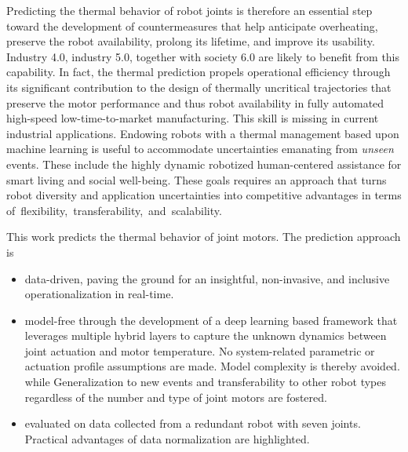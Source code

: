 \documentclass{ifacconf}
\begin{document}
Predicting the thermal behavior of robot joints is therefore an essential step toward the development of countermeasures that help anticipate overheating, preserve the robot availability,  prolong its lifetime, and improve its usability. Industry 4.0, industry 5.0, together with society 6.0 are likely to benefit from this capability. In fact, the thermal prediction propels operational efficiency through its significant contribution to the design of thermally uncritical trajectories that  preserve the motor performance and thus robot availability in fully automated high-speed low-time-to-market manufacturing. This skill is missing in current industrial applications. Endowing robots with a thermal management based upon machine learning is useful to accommodate uncertainties emanating from \textit{unseen} events. These include the highly dynamic robotized human-centered assistance for smart living and social well-being. These goals requires an approach that turns robot diversity and application uncertainties into competitive advantages in terms \mbox{of flexibility,  transferability, and scalability.}

This work predicts  the thermal behavior of joint motors. The prediction approach is
\begin{itemize}
	\item data-driven, paving the ground for an  insightful, non-invasive, and inclusive operationalization in real-time. %
	\item model-free through the development of a deep learning based framework that leverages multiple hybrid layers to capture the unknown dynamics between joint actuation and motor temperature. No system-related parametric or actuation profile assumptions are made. Model complexity is thereby avoided. while Generalization to new events and transferability to other robot types {regardless of the number and type of joint motors are fostered.}
	\item evaluated on data collected from a redundant robot with seven joints. Practical advantages of data normalization are highlighted.
\end{itemize}
\end{document}

